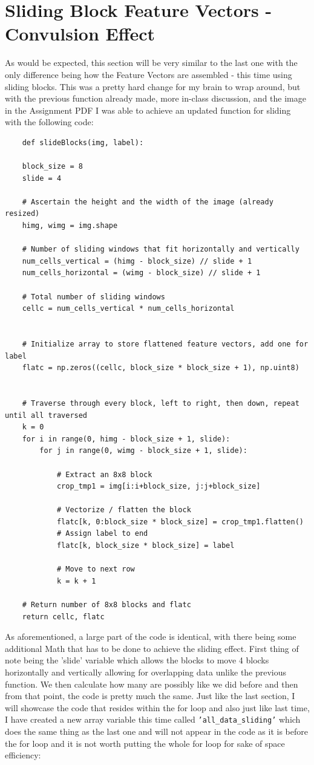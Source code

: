 \documentclass[conference]{IEEEtran} %
\begin{document}
\section{Sliding Block Feature Vectors - Convulsion Effect}
As would be expected, this section will be very similar to the last one with the only difference being how the Feature Vectors are assembled - this time using sliding blocks.  This was a pretty hard change for my brain to wrap around, but with the previous function already made, more in-class discussion, and the image in the Assignment PDF I was able to achieve an updated function for sliding with the following code:
\begin{lstlisting}
    def slideBlocks(img, label):
    
    block_size = 8
    slide = 4
    
    # Ascertain the height and the width of the image (already resized)
    himg, wimg = img.shape
    
    # Number of sliding windows that fit horizontally and vertically
    num_cells_vertical = (himg - block_size) // slide + 1
    num_cells_horizontal = (wimg - block_size) // slide + 1
    
    # Total number of sliding windows
    cellc = num_cells_vertical * num_cells_horizontal
    
    
    # Initialize array to store flattened feature vectors, add one for label
    flatc = np.zeros((cellc, block_size * block_size + 1), np.uint8)
    
    
    # Traverse through every block, left to right, then down, repeat until all traversed
    k = 0
    for i in range(0, himg - block_size + 1, slide):
        for j in range(0, wimg - block_size + 1, slide):
            
            # Extract an 8x8 block
            crop_tmp1 = img[i:i+block_size, j:j+block_size]
            
            # Vectorize / flatten the block
            flatc[k, 0:block_size * block_size] = crop_tmp1.flatten()
            # Assign label to end
            flatc[k, block_size * block_size] = label 
            
            # Move to next row
            k = k + 1
            
    # Return number of 8x8 blocks and flatc
    return cellc, flatc
\end{lstlisting}

As aforementioned, a large part of the code is identical, with there being some additional Math that has to be done to achieve the sliding effect.  First thing of note being the 'slide' variable which allows the blocks to move 4 blocks horizontally and vertically allowing for overlapping data unlike the previous function.  We then calculate how many are possibly like we did before and then from that point, the code is pretty much the same.  Just like the last section, I will showcase the code that resides within the for loop and also just like last time, I have created a new array variable this time called \texttt{'all\_data\_sliding'} which does the same thing as the last one and will not appear in the code as it is before the for loop and it is not worth putting the whole for loop for sake of space efficiency:
\end{document}
